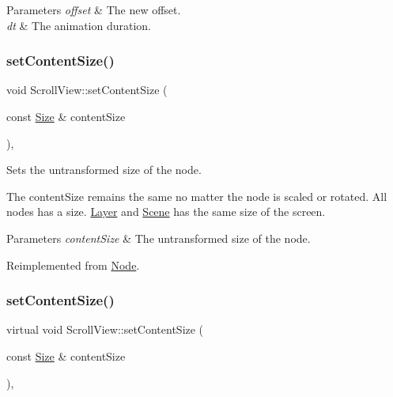 \begin{DoxyParams}{Parameters}
{\em offset} & The new offset. \\
\hline
{\em dt} & The animation duration. \\
\hline
\end{DoxyParams}
\mbox{\label{classScrollView_a3cf1d7fd072898e64498a7dc9c5932c1}} 
\subsubsection{\texorpdfstring{set\+Content\+Size()}{setContentSize()}\hspace{0.1cm}{\footnotesize\ttfamily [1/2]}}
{\footnotesize\ttfamily void Scroll\+View\+::set\+Content\+Size (\begin{DoxyParamCaption}\item[{const \hyperlink{classSize}{Size} \&}]{content\+Size }\end{DoxyParamCaption})\hspace{0.3cm}{\ttfamily [override]}, {\ttfamily [virtual]}}

Sets the untransformed size of the node.

The content\+Size remains the same no matter the node is scaled or rotated. All nodes has a size. \hyperlink{classLayer}{Layer} and \hyperlink{classScene}{Scene} has the same size of the screen.


\begin{DoxyParams}{Parameters}
{\em content\+Size} & The untransformed size of the node. \\
\hline
\end{DoxyParams}


Reimplemented from \hyperlink{classNode_ade113d7fc9244f58ac98a4712da49818}{Node}.

\mbox{\label{classScrollView_a9d52bf1ed3831200285167c35fafa686}} 
\subsubsection{\texorpdfstring{set\+Content\+Size()}{setContentSize()}\hspace{0.1cm}{\footnotesize\ttfamily [2/2]}}
{\footnotesize\ttfamily virtual void Scroll\+View\+::set\+Content\+Size (\begin{DoxyParamCaption}\item[{const \hyperlink{classSize}{Size} \&}]{content\+Size }\end{DoxyParamCaption})\hspace{0.3cm}{\ttfamily [override]}, {\ttfamily [virtual]}}

